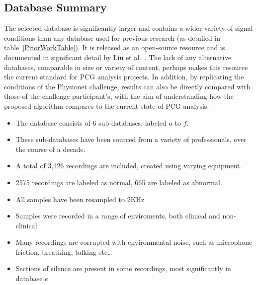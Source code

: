 \documentclass[titlepage, 12pt]{scrartcl} \usepackage{enumitem}
\begin{document}
\subsection{Database Summary}
The selected database is significantly larger and contains a wider variety of
signal conditions than any database used for previous research (as detailed in
table~\ref{PriorWorkTable}). It is released as an open-source resource and is
documented in significant detail by Liu et al.~\parencite{Liu2016}. The lack
of any alternative databases, comparable in size or variety of content, perhaps
makes this resource the current standard for PCG analysis projects. In
addition, by replicating the conditions of the Physionet challenge, results can
also be directly compared with those of the challenge participant's, with the
aim of understanding how the proposed algorithm compares to the current state
of PCG analysis.

\begin{itemize}
    \item The database consists of 6 sub-databases, labeled $a$ to $f$.
    \item These sub-databases have been sourced from a variety of professionals,
        over the course of a decade.
    \item A total of 3,126 recordings are included, created using varying equipment.
    \item 2575 recordings are labeled as normal, 665 are labeled as abnormal.
    \item All samples have been resampled to 2KHz
    \item Samples were recorded in a range of enviroments, both clinical and
        non-clinical.
    \item Many recordings are corrupted with environmental noise, such as
        microphone friction, breathing, talking etc\ldots
    \item Sections of silence are present in some recordings, most
        significantly in database $e$
\end{itemize}
\end{document}
